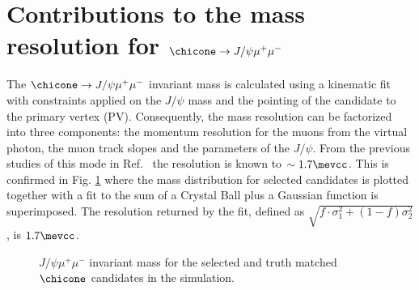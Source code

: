 \section{Contributions to the mass resolution for $\chicone \rightarrow J/\psi \mu^+ \mu^-$}
\label{sec:chic}
%
The $\chicone \rightarrow J/\psi \mu^+ \mu^-$ invariant mass is
calculated using a kinematic fit \cite{Hulsbergen:2005pu} with constraints applied on the
$J/\psi$ mass and the pointing of the candidate to the primary
vertex (PV). Consequently,  the mass resolution can be factorized into three components: the
momentum resolution for the muons from the virtual photon, the muon
track slopes and the parameters of the $J/\psi$. From the previous
studies of this mode in Ref.~\cite{Anderlini:2270922} the resolution is known to $\sim 1.7
\mevcc$. This is confirmed in Fig. \ref{fig:gcb} where the mass
distribution for selected candidates is plotted together with a fit to
the sum of a Crystal Ball \cite{Skwarnicki:1986xj} plus a Gaussian function is superimposed. The
resolution returned by the fit, defined as $\sqrt{ f \cdot \sigma_1^2
  + (1-f) \sigma_2^2}$, is $1.7 \mevcc$.   
\begin{figure}[htb!]
\begin{center}
\caption{\small  $J/\psi \mu^+ \mu^-$ invariant mass for the selected
  and truth matched $\chicone$ candidates in the simulation. }
\label{fig:gcb}
\end{center}
\end{figure}

